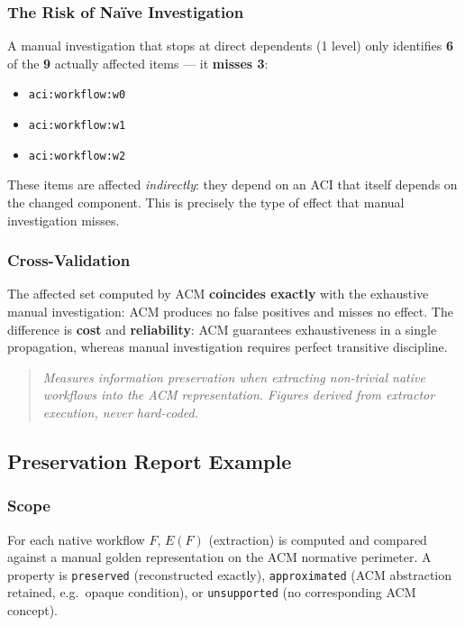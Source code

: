 \documentclass[10pt]{article}
\newcommand{\statuspreserved}{\textcolor{preservedgreen}{\texttt{preserved}}}
\newcommand{\statusapproximated}{\textcolor{approximatedorange}{\texttt{approximated}}}
\newcommand{\statusunsupported}{\textcolor{unsupportedgray}{\texttt{unsupported}}}
\begin{document}
\subsubsection{The Risk of Na\"ive Investigation}

A manual investigation that stops at direct dependents (1 level) only identifies \textbf{6} of the \textbf{9} actually affected items --- it \textcolor{alertred}{\textbf{misses 3}}:

\begin{itemize}[leftmargin=2em]
	\item \texttt{aci:workflow:w0}
	\item \texttt{aci:workflow:w1}
	\item \texttt{aci:workflow:w2}
\end{itemize}

These items are affected \emph{indirectly}: they depend on an ACI that itself depends on the changed component. This is precisely the type of effect that manual investigation misses.

\subsubsection{Cross-Validation}

The affected set computed by ACM \textbf{coincides exactly} with the exhaustive manual investigation: ACM produces no false positives and misses no effect. The difference is \textbf{cost} and \textbf{reliability}: ACM guarantees exhaustiveness in a single propagation, whereas manual investigation requires perfect transitive discipline.

\begin{quote}
	\textit{Measures information preservation when extracting non-trivial native workflows into the ACM representation. Figures derived from extractor execution, never hard-coded.}
\end{quote}

\subsection{Preservation Report Example}
\subsubsection{Scope}

For each native workflow $F$, $E(F)$ (extraction) is computed and compared against a manual golden representation on the ACM normative perimeter. A property is \statuspreserved{} (reconstructed exactly), \statusapproximated{} (ACM abstraction retained, e.g.\ opaque condition), or \statusunsupported{} (no corresponding ACM concept).
\end{document}
